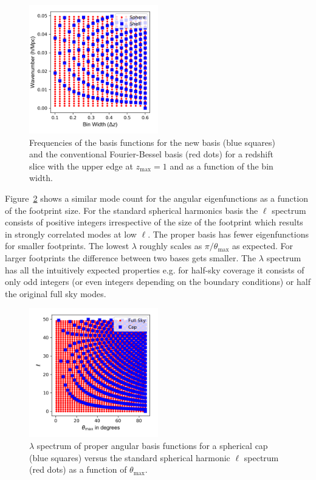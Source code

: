 \documentclass[fleqn,usenatbib]{mnras}
\begin{document}
\begin{figure}
\includegraphics[clip,trim={0 0.5cm 0 0.5cm},width=0.5\textwidth]{modes_comparison.png}
\caption{Frequencies of the basis functions for the new basis (blue squares)
and the conventional Fourier-Bessel basis (red dots) for a redshift slice with
the upper edge at $z_\mathrm{max} = 1$ and as a function of the bin width.}
\label{fig:radmodesnum}
\end{figure}

Figure~\ref{fig:angmodesnum} shows a similar mode count for the angular
eigenfunctions as a function of the footprint size. For the standard spherical
harmonics basis the $\ell$ spectrum consists of positive integers irrespective
of the size of the footprint which results in strongly correlated modes at low
$\ell$. The proper basis has fewer eigenfunctions for smaller footprints. The
lowest $\lambda$ roughly scales as $\pi/\theta_\mathrm{max}$ as expected. For
larger footprints the difference between two bases gets smaller. The $\lambda$
spectrum has all the intuitively expected properties e.g. for half-sky coverage
it consists of only odd integers (or even integers depending on the boundary
conditions) or half the original full sky modes.

\begin{figure}
\includegraphics[clip, trim={0 0.5cm 0 0.5cm},width=0.5\textwidth]{ell_m_comparison.png}
\caption{$\lambda$ spectrum of proper angular basis functions for a spherical
cap (blue squares) versus the standard spherical harmonic $\ell$ spectrum (red
dots) as a function of $\theta_\mathrm{max}$.}
\label{fig:angmodesnum}
\end{figure}
\end{document}
